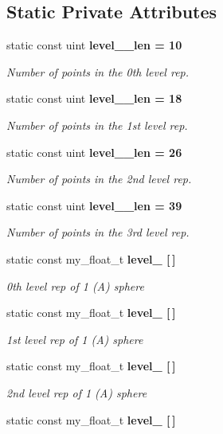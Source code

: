 \subsection*{Static Private Attributes}
\begin{CompactItemize}
\item 
static const uint \bf{level\_\_\-len} = 10\label{classASCbase_1_1DiscreteSphere_272db3a33db89cfda38c0a2f7e488bca}

\begin{CompactList}\small\item\em Number of points in the 0th level rep. \item\end{CompactList}\item 
static const uint \bf{level\_\_\-len} = 18\label{classASCbase_1_1DiscreteSphere_f067998b14bfba388d2f803330d6792c}

\begin{CompactList}\small\item\em Number of points in the 1st level rep. \item\end{CompactList}\item 
static const uint \bf{level\_\_\-len} = 26\label{classASCbase_1_1DiscreteSphere_59d0d77b116b29ec295f48add6fec024}

\begin{CompactList}\small\item\em Number of points in the 2nd level rep. \item\end{CompactList}\item 
static const uint \bf{level\_\_\-len} = 39\label{classASCbase_1_1DiscreteSphere_066b8e66f73f541fb02b82ed853a3aed}

\begin{CompactList}\small\item\em Number of points in the 3rd level rep. \item\end{CompactList}\item 
static const my\_\-float\_\-t \bf{level\_} [$\,$]
\begin{CompactList}\small\item\em 0th level rep of 1 (A) sphere \item\end{CompactList}\item 
static const my\_\-float\_\-t \bf{level\_} [$\,$]
\begin{CompactList}\small\item\em 1st level rep of 1 (A) sphere \item\end{CompactList}\item 
static const my\_\-float\_\-t \bf{level\_} [$\,$]
\begin{CompactList}\small\item\em 2nd level rep of 1 (A) sphere \item\end{CompactList}\item 
static const my\_\-float\_\-t \bf{level\_} [$\,$]\label{classASCbase_1_1DiscreteSphere_a074b8dd69e55ae9ac9020e3d5a56a7d}


\end{CompactItemize}
